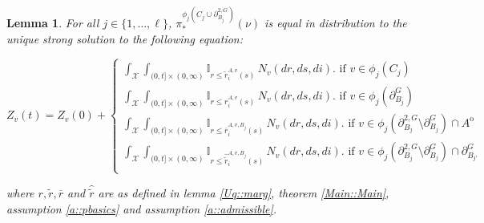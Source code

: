\documentclass[12pt]{article}
\newcommand{\mb}{\mathbb}
\newcommand{\mc}{\mathcal}
\newcommand{\ov}{\overline}
\newcommand{\te}{\text}
\newcommand{\sta}{\mc{X}}							%
\newcommand{\gneigh}[2]{\partial^{#1}_{#2}}			%
\newcommand{\dgneigh}[2]{\partial^{2,#1}_{#2}}		%
\newcommand{\poiss}{N}								%
\newcommand{\rate}{r}								%
\newcommand{\proj}{\pi}								%
\newcommand{\poissv}[1]{_{#1}}						%
\newcommand{\vind}[1]{_{#1}}						%
\newcommand{\tme}[1]{(#1)}							%
\newcommand{\vpara}[1]{^{#1}}						%
\newcommand{\stpara}[1]{_{#1}}						%
\newcommand{\gvpara}[2]{^{#1,#2}}					%
\newcommand{\psf}{_*}								%
\newcommand{\psize}{\ell}							%
\newcommand{\brate}{\alt{\rate}}					%
\newcommand{\inte}[1]{{#1}^\mathrm{o}}				%
\newcommand{\alt}[1]{\tilde{#1}}					%
\newcommand{\mm}{\nu}								%
\newcommand{\Xh}{Z}									%
\newcommand{\bgrate}{\ov{\rate}}					%
\newcommand{\bcrate}{\hat{\brate}}					%
\newcommand{\gvjpara}[3]{^{#1,#2,#3}}				%
\newtheorem{lem}[thms]{Lemma}
\begin{document}
\begin{lem}
For all \(j \in \{1,\dots,\psize\}\), \(\proj\psf\vpara{\phi_j\left(C_j\cup\dgneigh{G}{B_j}\right)}(\mm)\) is equal in distribution to the unique strong solution to the following equation:

\begin{equation}
\Xh\vind{v}\tme{t} = \Xh\vind{v}\tme{0} + \begin{cases}
\int_\sta\int_{(0,t]\times(0,\infty)} \mb{I}_{r \leq \brate\gvpara{A}{v}\stpara{i}\tme{s}}\,\poiss\poissv{v}(dr,ds,di).\te{ if } v \in \phi_j(C_j)\\
\int_\sta\int_{(0,t]\times(0,\infty)} \mb{I}_{r \leq \rate\gvpara{A}{v}\stpara{i}\tme{s}}\,\poiss\poissv{v}(dr,ds,di).\te{ if } v \in \phi_j(\gneigh{G}{B_j})\\
\int_\sta\int_{(0,t]\times(0,\infty)} \mb{I}_{r \leq \bgrate\gvjpara{A}{v}{B_j}\stpara{i}\tme{s}}\,\poiss\poissv{v}(dr,ds,di).\te{ if } v \in \phi_j(\dgneigh{G}{B_j}\setminus\gneigh{G}{B_j})\cap\inte{A}\\
\int_\sta\int_{(0,t]\times(0,\infty)} \mb{I}_{r \leq \bcrate\gvjpara{A}{v}{B_j}\stpara{i}\tme{s}}\,\poiss\poissv{v}(dr,ds,di).\te{ if } v \in \phi_j(\dgneigh{G}{B_j}\setminus\gneigh{G}{B_j})\cap\gneigh{G}{B_{j'}}\\
\end{cases}
\label{Uq::marg2eqn}
\end{equation}

where \(\rate,\brate,\bgrate\) and \(\bcrate\) are as defined in lemma \ref{Uq::marg}, theorem \ref{Main::Main}, assumption \ref{a::pbasics} and assumption \ref{a::admissible}.
\label{Uq::marg2}
\end{lem}
\end{document}
